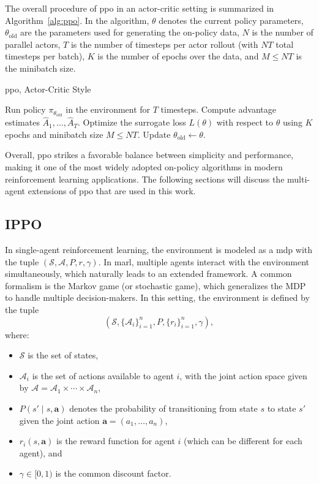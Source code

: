 The overall procedure of \gls{ppo} in an actor-critic setting is summarized in Algorithm~\ref{alg:ppo}. In the algorithm, \(\theta\) denotes the current policy parameters, \(\theta_{\text{old}}\) are the parameters used for generating the on-policy data, \(N\) is the number of parallel actors, \(T\) is the number of timesteps per actor rollout (with \(NT\) total timesteps per batch), \(K\) is the number of epochs over the data, and \(M \le NT\) is the minibatch size.


\begin{algorithm}[H]
\caption{\gls{ppo}, Actor-Critic Style}
\label{alg:ppo}
\begin{algorithmic}[1]
        \State Run policy \(\pi_{\theta_{\text{old}}}\) in the environment for \(T\) timesteps.
        \State Compute advantage estimates \(\hat{A}_1, \dots, \hat{A}_T\).
    \EndFor
    \State Optimize the surrogate loss \(L(\theta)\) with respect to \(\theta\) using \(K\) epochs and minibatch size \(M \le NT\).
    \State Update \(\theta_{\text{old}} \leftarrow \theta\).
\EndFor
\end{algorithmic}
\end{algorithm}

Overall, \gls{ppo} strikes a favorable balance between simplicity and performance, making it one of the most widely adopted on-policy algorithms in modern reinforcement learning applications. The following sections will discuss the multi-agent extensions of \gls{ppo} that are used in this work.
\subsection{IPPO}
In single-agent reinforcement learning, the environment is modeled as a \gls{mdp} with the tuple \((\mathcal{S}, \mathcal{A}, P, r, \gamma)\). In \gls{marl}, multiple agents interact with the environment simultaneously, which naturally leads to an extended framework. A common formalism is the Markov game (or stochastic game), which generalizes the MDP to handle multiple decision-makers. In this setting, the environment is defined by the tuple
\[
(\mathcal{S}, \{\mathcal{A}_i\}_{i=1}^n, P, \{r_i\}_{i=1}^n, \gamma),
\]
where:
\begin{itemize}
    \item \(\mathcal{S}\) is the set of states,
    \item \(\mathcal{A}_i\) is the set of actions available to agent \(i\), with the joint action space given by \(\mathcal{A} = \mathcal{A}_1 \times \cdots \times \mathcal{A}_n\),
    \item \(P(s' \mid s, \mathbf{a})\) denotes the probability of transitioning from state \(s\) to state \(s'\) given the joint action \(\mathbf{a} = (a_1, \dots, a_n)\),
    \item \(r_i(s, \mathbf{a})\) is the reward function for agent \(i\) (which can be different for each agent), and
    \item \(\gamma \in [0,1)\) is the common discount factor.
\end{itemize}

